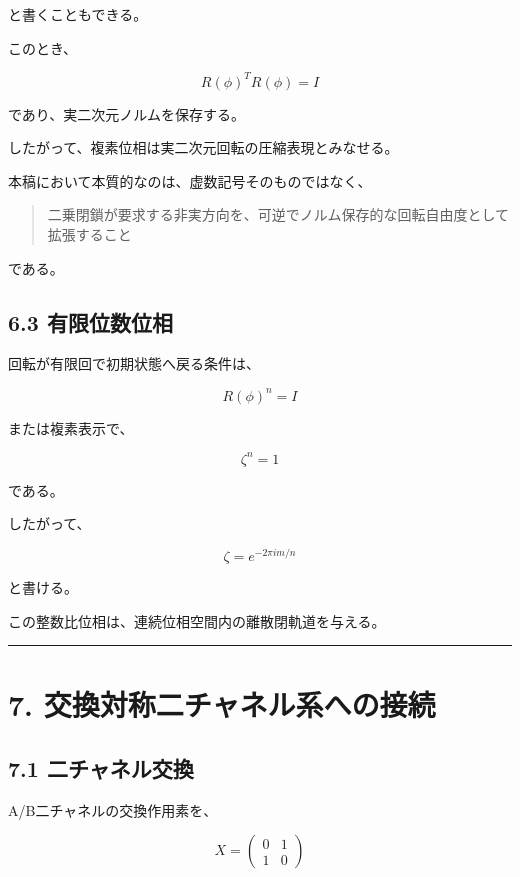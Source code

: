 \documentclass[
  a4paper,
  10pt]{article}
\begin{document}
と書くこともできる。

このとき、

\[
R(\phi)^TR(\phi)=I
\]

であり、実二次元ノルムを保存する。

したがって、複素位相は実二次元回転の圧縮表現とみなせる。

本稿において本質的なのは、虚数記号そのものではなく、

\begin{quote}
二乗閉鎖が要求する非実方向を、可逆でノルム保存的な回転自由度として拡張すること
\end{quote}

である。

\subsection{6.3
有限位数位相}\label{63-ux6709ux9650ux4f4dux6570ux4f4dux76f8}

回転が有限回で初期状態へ戻る条件は、

\[
R(\phi)^n=I
\]

または複素表示で、

\[
\zeta^n=1
\]

である。

したがって、

\[
\zeta=e^{-2\pi im/n}
\]

と書ける。

この整数比位相は、連続位相空間内の離散閉軌道を与える。

\begin{center}\rule{0.5\linewidth}{0.5pt}\end{center}

\section{7.
交換対称二チャネル系への接続}\label{7-ux4ea4ux63dbux5bfeux79f0ux4e8cux30c1ux30e3ux30cdux30ebux7cfbux3078ux306eux63a5ux7d9a}

\subsection{7.1
二チャネル交換}\label{71-ux4e8cux30c1ux30e3ux30cdux30ebux4ea4ux63db}

A/B二チャネルの交換作用素を、

\[
X=
\begin{pmatrix}
0&1\\
1&0
\end{pmatrix}
\]
\end{document}
